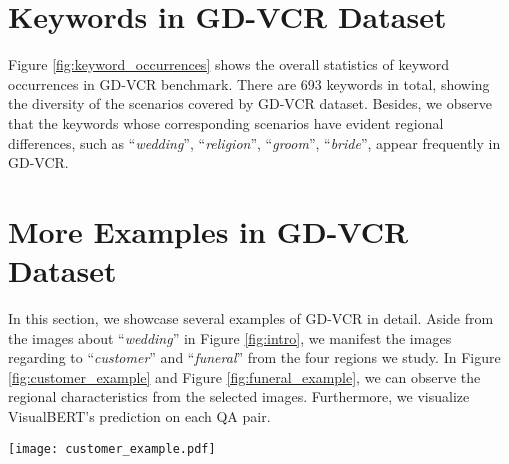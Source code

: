 \documentclass[11pt]{article}
\begin{document}
\begin{table}[t]
\centering
{}
\caption{Accuracy (\%) on the images involving the same scenarios from the original VCR dataset and non-Western regions from GD-VCR dataset, respectively.}
    \label{tab:compare_with_vcr}
\end{table}

\section{Keywords in GD-VCR Dataset}
Figure \ref{fig:keyword_occurrences} shows the overall statistics of keyword occurrences in GD-VCR benchmark. There are 693 keywords in total, showing the diversity of the scenarios covered by GD-VCR dataset. Besides, we observe that the keywords whose corresponding scenarios have evident regional differences, such as ``\textit{wedding}'', ``\textit{religion}'', ``\textit{groom}'', ``\textit{bride}'', appear frequently in GD-VCR.  

\section{More Examples in GD-VCR Dataset}
\label{appendix:examples}
In this section, we showcase several examples of GD-VCR in detail. Aside from the images about ``\textit{wedding}'' in Figure \ref{fig:intro}, we manifest the images regarding to ``\textit{customer}'' and ``\textit{funeral}'' from the four regions we study. In Figure \ref{fig:customer_example} and Figure \ref{fig:funeral_example}, we can observe the regional characteristics from the selected images. Furthermore, we visualize VisualBERT's prediction on each QA pair. 

\begin{figure*}[t]
    \centering
    \texttt{[image: customer\_example.pdf]}
    \caption{Examples of the images regarding ``\textit{customer}''. Left-to-right order: Western, South Asia, East Asia. We visualize the prediction of the VisualBERT model fine-tuned on the original VCR training set. The blue blocks denote the right answer choices. If red block appears, it means that VisualBERT wrongly predict the answer. The rightmost value indicates the probability of the corresponding choices being selected by VisualBERT.}
    \label{fig:customer_example}
\end{figure*}
\end{document}
